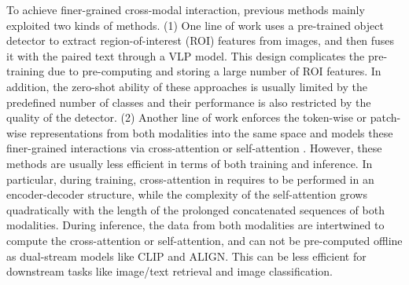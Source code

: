 To achieve finer-grained cross-modal interaction, previous methods mainly exploited two kinds of methods.
(1) One line of work \citep{chen2020uniter,li2020oscar,m5product,li2020unimo,zhang2021vinvl,capture} uses a pre-trained object detector to extract region-of-interest (ROI) features from images, and then fuses it with the paired text through a VLP model.
This design complicates the pre-training due to  pre-computing and storing  a large number of ROI features. 
In addition, the zero-shot ability of these approaches is usually limited by the predefined number of classes and their performance is also restricted by the quality of the detector.
(2) Another line of work \citep{li2021align, kim2021vilt} 
enforces the token-wise or patch-wise representations from both modalities into the same space and models these finer-grained interactions via cross-attention \citep{li2021align} or self-attention \citep{kim2021vilt}. 
However, these methods are usually less efficient in terms of both training and inference. In particular, during training, cross-attention in \citep{li2021align} requires to be performed in an encoder-decoder structure, while the complexity of the self-attention \citep{kim2021vilt} grows quadratically with the length of the prolonged concatenated sequences of both modalities. During inference, the data from both modalities are intertwined to compute the cross-attention or self-attention, and can not be pre-computed offline as dual-stream models like CLIP and ALIGN.
This can be less efficient for downstream tasks like image/text retrieval and image classification.

